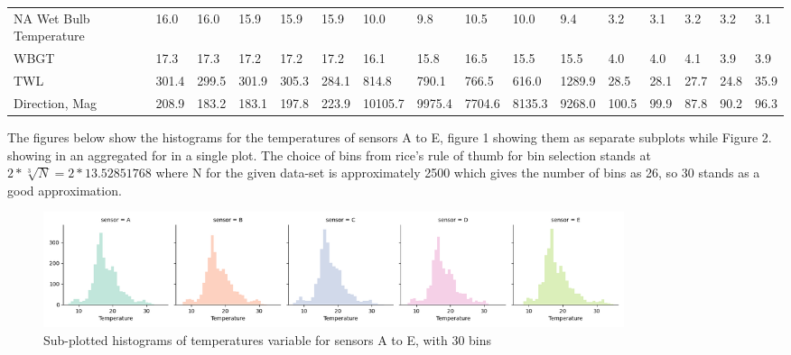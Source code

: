 \documentclass[a4paper]{article}
\begin{document}
{\begin{table}[htbp]
{\begin{tabular}{llllllllllllllll}
NA Wet Bulb Temperature      & 16.0       & 16.0       & 15.9       & 15.9       & 15.9                            & 10.0       & 9.8        & 10.5       & 10.0       & 9.4                             & 3.2        & 3.1        & 3.2        & 3.2        & 3.1        \\
WBGT                         & 17.3       & 17.3       & 17.2       & 17.2       & 17.2                            & 16.1       & 15.8       & 16.5       & 15.5       & 15.5                            & 4.0        & 4.0        & 4.1        & 3.9        & 3.9        \\
TWL                          & 301.4      & 299.5      & 301.9      & 305.3      & 284.1                           & 814.8      & 790.1      & 766.5      & 616.0      & 1289.9                          & 28.5       & 28.1       & 27.7       & 24.8       & 35.9       \\
Direction, Mag               & 208.9      & 183.2      & 183.1      & 197.8      & 223.9                           & 10105.7    & 9975.4     & 7704.6     & 8135.3     & 9268.0                          & 100.5      & 99.9       & 87.8       & 90.2       & 96.3      
\end{tabular}%
}
\label{tab:addlabel}%
\end{table}%
}


\noindent The figures below show the histograms for the temperatures of sensors A to E, figure 1 showing them as separate subplots while Figure 2.  showing in an aggregated for in a single plot. The choice of bins from rice’s rule of thumb for bin selection stands at  \(2 * \sqrt[3]{N} =2 * 13.52851768\) where N for the given data-set is approximately 2500 which gives the number of bins as 26, so 30 stands as a good approximation. 
\\


\begin{figure}[H]
\includegraphics[width=17cm]{images/a1_1.png}
\centering
\caption{Sub-plotted histograms of temperatures variable for sensors A to E, with 30 bins}
\end{figure}
\end{document}
